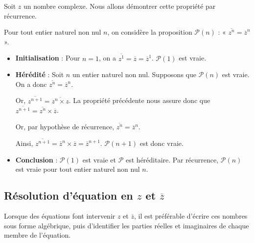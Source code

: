 \documentclass[11pt,fleqn, openany]{book} %
\begin{document}
\begin{demonstration}Soit $z$ un nombre complexe. Nous allons démontrer cette propriété par récurrence.

Pour tout entier naturel non nul $n$, on considère la proposition $\mathcal{P}(n)$ : « $\overline{z^n}=\overline{z}^n$ ».

\begin{itemize}
\item \textbf{Initialisation} : Pour $n=1$, on a $\overline{z^1}=\overline{z}=\overline{z}^1$. $\mathcal{P}(1)$ est vraie.
\item \textbf{Hérédité} : Soit $n$ un entier naturel non nul. Supposons que $\mathcal{P}(n)$ est vraie. On a donc $\overline{z^n}=\overline{z}^n$.

Or, $\overline{z^{n+1}}=\overline{z^n  \times z}$. La propriété précédente nous assure donc que $\overline{z^{n+1}}=\overline{z^n} \times \overline{z}$. 

Or, par hypothèse de récurrence, $\overline{z^n}=\overline{z}^n$.

Ainsi, $\overline{z^{n+1}}=\overline{z}^n \times \overline{z}=\overline{z}^{n+1}$. $\mathcal{P}(n+1)$ est donc vraie.
\item \textbf{Conclusion} : $\mathcal{P}(1)$ est vraie et $\mathcal{P}$ est héréditaire. Par récurrence, $\mathcal{P}(n)$ est vraie pour tout entier naturel non nul $n$.
\end{itemize}\end{demonstration}

\subsection{Résolution d'équation en $z$ et $\overline{z}$}

Lorsque des équations font intervenir $z$ et $\overline{z}$, il est préférable d'écrire ces nombres sous forme algébrique, puis d'identifier les parties réelles et imaginaires de chaque membre de l'équation.
\end{document}
